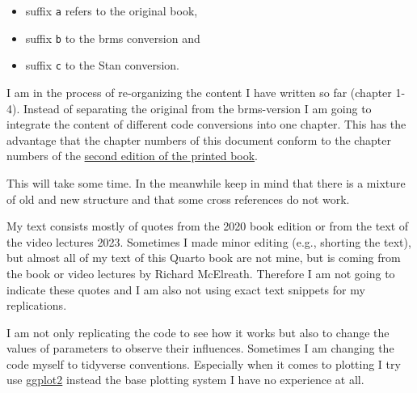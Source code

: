 \documentclass[
  letterpaper,
  DIV=11,
  numbers=noendperiod]{scrreprt}
\providecommand{\tightlist}{%
  \setlength{\itemsep}{0pt}\setlength{\parskip}{0pt}}\usepackage{longtable,booktabs,array}
\begin{document}
\begin{itemize}
\tightlist
\item
  suffix \texttt{a} refers to the original book,
\item
  suffix \texttt{b} to the brms conversion and
\item
  suffix \texttt{c} to the Stan conversion.
\end{itemize}

\begin{tcolorbox}[enhanced jigsaw, colframe=quarto-callout-caution-color-frame, colback=white, toprule=.15mm, breakable, arc=.35mm, bottomtitle=1mm, colbacktitle=quarto-callout-caution-color!10!white, toptitle=1mm, titlerule=0mm, title=\textcolor{quarto-callout-caution-color}{\faFire}\hspace{0.5em}{Caution (2023-17-07)}, leftrule=.75mm, opacityback=0, rightrule=.15mm, opacitybacktitle=0.6, bottomrule=.15mm, left=2mm, coltitle=black]

I am in the process of re-organizing the content I have written so far
(chapter 1-4). Instead of separating the original from the brms-version
I am going to integrate the content of different code conversions into
one chapter. This has the advantage that the chapter numbers of this
document conform to the chapter numbers of the
\href{https://www.routledge.com/Statistical-Rethinking-A-Bayesian-Course-with-Examples-in-R-and-STAN/McElreath/p/book/9780367139919}{second
edition of the printed book}.

This will take some time. In the meanwhile keep in mind that there is a
mixture of old and new structure and that some cross references do not
work.

\end{tcolorbox}

My text consists mostly of quotes from the 2020 book edition or from the
text of the video lectures 2023. Sometimes I made minor editing (e.g.,
shorting the text), but almost all of my text of this Quarto book are
not mine, but is coming from the book or video lectures by Richard
McElreath. Therefore I am not going to indicate these quotes and I am
also not using exact text snippets for my replications.

I am not only replicating the code to see how it works but also to
change the values of parameters to observe their influences. Sometimes I
am changing the code myself to tidyverse conventions. Especially when it
comes to plotting I try use
\href{https://ggplot2.tidyverse.org/reference/index.html}{ggplot2}
instead the base plotting system I have no experience at all.
\end{document}

